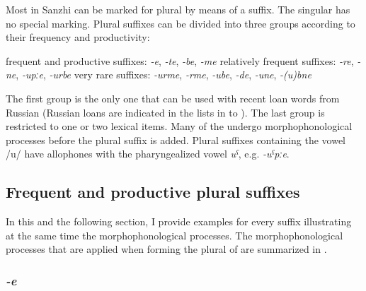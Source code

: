 Most  in Sanzhi can be marked for plural by means of a suffix. The singular has no special marking. Plural suffixes can be divided into three groups according to their frequency and productivity:
%
\begin{exe}
	\ex	\label{ex:pluralsuffixes}
	\begin{xlist}
		\ex	frequent and productive suffixes: 	\tab	\textit{-e}, \textit{-te}, \textit{-be}, \textit{-me} 
		\ex	relatively frequent suffixes: 		\tab	\textit{-re}, \textit{-ne}, \textit{-upːe}, \textit{-urbe} 
		\ex	very rare suffixes: 				\tab	\textit{-urme}, \textit{-rme}, \textit{-ube}, \textit{-de}, \textit{-une}, \textit{-(u)bne}
	\end{xlist}
\end{exe}

The first group is the only one that can be used with recent loan words from Russian (Russian loans are indicated in the lists in  to ). The last group is restricted to one or two lexical items. Many of the  undergo morphophonological processes before the plural suffix is added. Plural suffixes containing the vowel /u/ have allophones with the pharyngealized vowel \textit{uˁ}, e.g. \textit{-uˁpːe}.



\subsection{Frequent and productive plural suffixes}
\label{sec:FrequentAndProductivePluralSuffixes}
In this and the following section, I provide examples for every suffix illustrating at the same time the morphophonological processes. The morphophonological processes that are applied when forming the plural of  are summarized in .


\subsubsection*{\textit{-e}}


